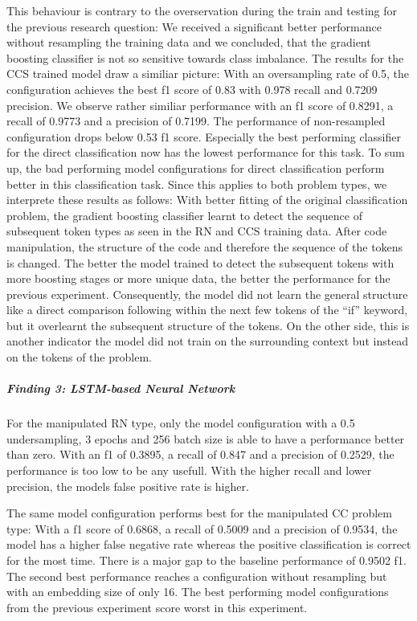 This behaviour is contrary to the overservation during the train and testing for the previous research question:  We received a significant better performance without resampling the training data and we concluded, that the gradient boosting classifier is not so sensitive towards class imbalance. 
The results for the CCS trained model draw a similiar picture: With an oversampling rate of 0.5, the configuration achieves the best f1 score of 0.83 with 0.978 recall and 0.7209 precision. We observe rather similiar performance with an f1 score of 0.8291, a recall of 0.9773 and a precision of 0.7199. The performance of non-resampled configuration drops below 0.53 f1 score. Especially the best performing classifier for the direct classification now has the lowest performance for this task. To sum up, the bad performing model configurations for direct classification perform better in this classification task. Since this applies to both problem types, we interprete these results as follows: With better fitting of the original classification problem, the gradient boosting classifier learnt to detect the sequence of subsequent token types as seen in the RN and CCS training data. After code manipulation, the structure of the code and therefore the sequence of the tokens is changed. The better the model trained to detect the subsequent tokens with more boosting stages or more unique data, the better the performance for the previous experiment. Consequently, the model did not learn the general structure like a direct comparison following within the next few tokens of the \enquote{if} keyword, but it overlearnt the subsequent structure of the tokens. On the other side, this is another indicator the model did not train on the surrounding context but instead on the tokens of the problem.

\subparagraph{Finding 3: LSTM-based Neural Network}
For the manipulated RN type, only the model configuration with a 0.5 undersampling, 3 epochs and 256 batch size is able to have a performance better than zero. With an f1 of 0.3895, a recall of 0.847 and a precision of 0.2529, the performance is too low to be any usefull. With the higher recall and lower precision, the models false positive rate is higher.

The same model configuration performs best for the manipulated CC problem type: With a f1 score of 0.6868, a recall of 0.5009 and a precision of 0.9534, the model has a higher false negative rate whereas the positive classification is correct for the most time. There is a major gap to the baseline performance of 0.9502 f1. 
The second best performance reaches a configuration without resampling but with an embedding size of only 16. The best performing model configurations from the previous experiment score worst in this experiment.

